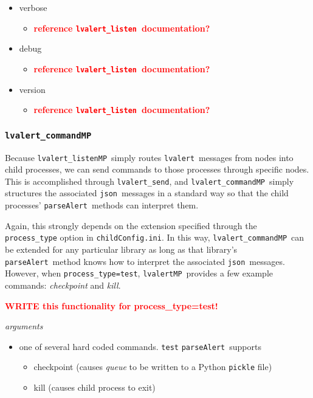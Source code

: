 \documentclass{article}
\newcommand{\FIXME}[1]{\textcolor{red}{\textbf{#1}}}
\newcommand{\alert}{\texttt{lvalert}}
\newcommand{\lvalertListen}{\texttt{lvalert\_listen}}
\newcommand{\lvalertSend}{\texttt{lvalert\_send}}
\newcommand{\lvalertMP}{\texttt{lvalertMP}}
\newcommand{\lvalertListenMP}{\texttt{lvalert\_listenMP}}
\newcommand{\lvalertCommandMP}{\texttt{lvalert\_commandMP}}
\newcommand{\parseAlert}{\texttt{parseAlert}}
\newcommand{\childConfigini}{\texttt{childConfig.ini}}
\newcommand{\json}{\texttt{json}}
\begin{document}
\begin{itemize}
{         }
    \item{verbose
        \begin{itemize}
            \item{\FIXME{reference \lvalertListen~documentation?}}
        \end{itemize}
         }
    \item{debug
        \begin{itemize}
            \item{\FIXME{reference \lvalertListen~documentation?}}
        \end{itemize}
         }
    \item{version
        \begin{itemize}
            \item{\FIXME{reference \lvalertListen~documentation?}}
        \end{itemize}
         }
\end{itemize}


\subsubsection{\lvalertCommandMP}
\label{sec: lvalertCommandMP}

Because \lvalertListenMP~simply routes \alert~messages from nodes into child processes, we can send commands to those processes through specific nodes.
This is accomplished through \lvalertSend, and \lvalertCommandMP~simply structures the associated \json~messages in a standard way so that the child processes' \parseAlert~methods can interpret them.

Again, this strongly depends on the extension specified through the \texttt{process\_type} option in \childConfigini. 
In this way, \lvalertCommandMP~can be extended for any particular library as long as that library's \parseAlert~method knows how to interpret the associated \json~messages.
However, when \texttt{process\_type=test}, \lvalertMP~provides a few example commands: \textit{checkpoint} and \textit{kill}.

\FIXME{WRITE this functionality for process\_type=test!}

\vspace{0.5cm}
\noindent
\textit{arguments}

\begin{itemize}
    \item{one of several hard coded commands. \texttt{test} \parseAlert~supports
        \begin{itemize}
            \item{checkpoint (causes \textit{queue} to be written to a Python \texttt{pickle} file)}
            \item{kill (causes child process to exit)}
        \end{itemize}
         }
\end{itemize}
\end{document}
